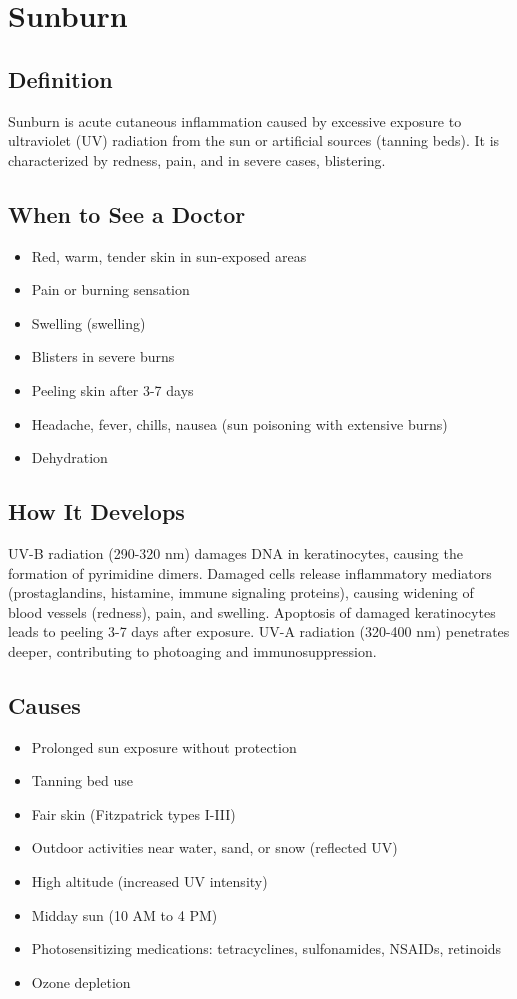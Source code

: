 \chapter{Sunburn}

\section*{Definition}
Sunburn is acute cutaneous inflammation caused by excessive exposure to ultraviolet (UV) radiation from the sun or artificial sources (tanning beds). It is characterized by redness, pain, and in severe cases, blistering.

\section*{When to See a Doctor}
\begin{itemize}
\item Red, warm, tender skin in sun-exposed areas
\item Pain or burning sensation
\item Swelling (swelling)
\item Blisters in severe burns
\item Peeling skin after 3-7 days
\item Headache, fever, chills, nausea (sun poisoning with extensive burns)
\item Dehydration
\end{itemize}

\section*{How It Develops}
UV-B radiation (290-320 nm) damages DNA in keratinocytes, causing the formation of pyrimidine dimers. Damaged cells release inflammatory mediators (prostaglandins, histamine, immune signaling proteins), causing widening of blood vessels (redness), pain, and swelling. Apoptosis of damaged keratinocytes leads to peeling 3-7 days after exposure. UV-A radiation (320-400 nm) penetrates deeper, contributing to photoaging and immunosuppression.

\section*{Causes}
\begin{itemize}
\item Prolonged sun exposure without protection
\item Tanning bed use
\item Fair skin (Fitzpatrick types I-III)
\item Outdoor activities near water, sand, or snow (reflected UV)
\item High altitude (increased UV intensity)
\item Midday sun (10 AM to 4 PM)
\item Photosensitizing medications: tetracyclines, sulfonamides, NSAIDs, retinoids
\item Ozone depletion
\end{itemize}

